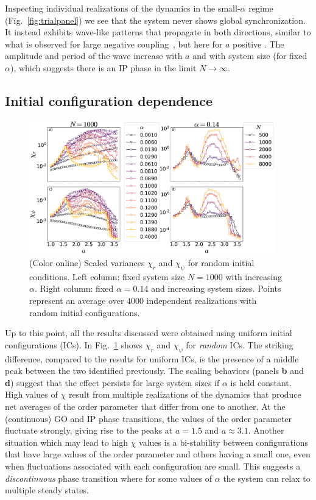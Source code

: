 Inspecting individual realizations of the dynamics in the small-$\alpha$ regime (Fig.~\ref{fig:trialpanel}) we see that the system
never shows global synchronization. It instead exhibits wave-like patterns that propagate in both directions, similar to what is
observed for large negative coupling~\cite{escaff2014arrays}, but here for $a$ positive . The amplitude and period of the wave increase
with $a$ and with system size (for fixed $\alpha$), which suggests there is an IP phase in the limit $N\to\infty$.

\subsection{Initial configuration dependence}

\begin{figure}[b]
\begin{center}
    \includegraphics[width=0.95\textwidth]{fig/chap2/chi_curves_randomic.eps}
\caption{\label{fig:chicurvesrandom} (Color online) Scaled variances $\chi_r$ and $\chi_{\psi}$ for random initial conditions.  Left
column: fixed system size $N=1000$ with increasing $\alpha$.  Right column: fixed $\alpha=0.14$ and increasing system sizes.  Points
represent an average over 4000 independent realizations with random initial configurations.}
\end{center}
\end{figure}

Up to this point, all the results discussed were obtained using uniform initial configurations (ICs).  In
Fig.~\ref{fig:chicurvesrandom} shows $\chi_r$ and $\chi_{\psi}$ for \textit{random} ICs. The striking difference, compared to the results
for uniform ICs, is the presence of a middle peak between the two identified previously. The scaling behaviors (panels \textbf{b} and
\textbf{d}) suggest that the effect persists for large system sizes if $\alpha$ is held constant. High values of $\chi$ result from
multiple realizations of the dynamics that produce net averages of the order parameter that differ from one to another. At the
(continuous) GO and IP phase transitions, the values of the order parameter fluctuate strongly, giving rise to the peaks at $a=1.5$ and
$a\approx 3.1$. Another situation which may lead to high $\chi$ values is a bi-stability between configurations that have large values
of the order parameter and others having a small one, even when fluctuations associated with each configuration are small. This
suggests a \textit{discontinuous} phase transition where for some values of $\alpha$ the system can relax to multiple steady states. 


